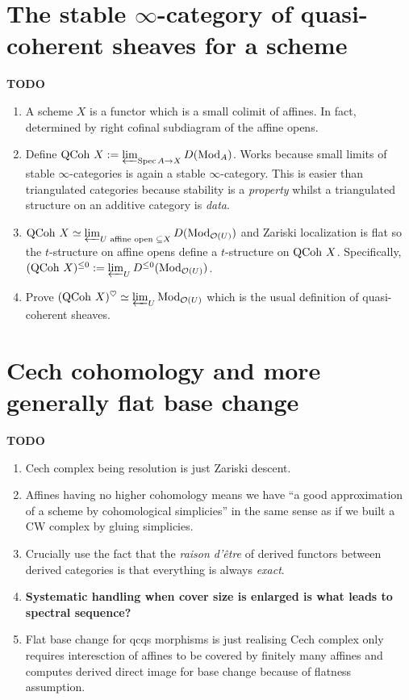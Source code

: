 \documentclass{article}
\begin{document}
\section{The stable $\infty$-category of quasi-coherent sheaves for a scheme}

\textbf{TODO}
\begin{enumerate}
  \item A scheme $X$ is a functor which is a small colimit of affines.
  In fact, determined by right cofinal subdiagram of the affine opens.
  \item Define $\operatorname{QCoh}\,X := \varprojlim_{\operatorname{Spec} A \to X} D(\mathrm{Mod}_A)$.
  Works because small limits of stable $\infty$-categories is
  again a stable $\infty$-category.
  This is easier than triangulated categories 
  because stability is a \emph{property}
  whilst a triangulated structure on an additive category is \emph{data}.
  \item $\operatorname{QCoh}\,X \simeq \varprojlim_{U \text{ affine open }\subseteq X} D(\mathrm{Mod}_{\mathcal{O}(U)})$
  and Zariski localization is flat so the $t$-structure 
  on affine opens define a $t$-structure on $\operatorname{QCoh}\,X$.
  Specifically, $(\operatorname{QCoh}\,X)^{\leq 0} := \varprojlim_{U} D^{\leq 0}(\mathrm{Mod}_{\mathcal{O}(U)})$.
  \item Prove $(\operatorname{QCoh} \,X)^\heartsuit \simeq \varprojlim_{U} \mathrm{Mod}_{\mathcal{O}(U)}$
  which is the usual definition of quasi-coherent sheaves.
\end{enumerate}

\section{Cech cohomology and more generally flat base change}

\textbf{TODO}
\begin{enumerate}
  \item Cech complex being resolution is just Zariski descent.
  \item Affines having no higher cohomology
  means we have ``a good approximation of a scheme
  by cohomological simplicies'' in the same sense
  as if we built a CW complex by gluing simplicies.
  \item Crucially use the fact that the \emph{raison d'être}
  of derived functors between derived categories is that
  everything is always \emph{exact}.
  \item \textbf{Systematic handling when cover size is enlarged
  is what leads to spectral sequence?}
  \item Flat base change for qcqs morphisms is just realising
  Cech complex only requires interesction of affines to be 
  covered by finitely many affines and computes derived direct image
  for base change because of flatness assumption.
\end{enumerate}

\printbibliography
\end{document}

